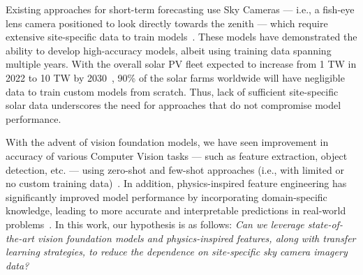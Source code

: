

Existing approaches for short-term forecasting use Sky Cameras --- i.e., a fish-eye lens camera positioned to look directly towards the zenith --- which require extensive site-specific data to train models~\cite{hammond2024,wacv2022}. These models have demonstrated the ability to develop high-accuracy models, albeit using training data spanning multiple years. With the overall solar PV fleet expected to increase from 1 TW in 2022 to 10 TW by 2030~\cite{isa2023}, 90\% of the solar farms worldwide will have negligible data to train custom models from scratch. Thus, lack of sufficient site-specific solar data underscores the need for approaches that do not compromise model performance.

With the advent of vision foundation models, we have seen improvement in accuracy of various Computer Vision tasks --- such as feature extraction, object detection, etc. --- using zero-shot and few-shot approaches (i.e., with limited or no custom training data)~\cite{google_vit, object_detection_foundation_models, vits_gt_cnns1}. In addition, physics-inspired feature engineering has significantly improved model performance by incorporating domain-specific knowledge, leading to more accurate and interpretable predictions in real-world problems~\cite{ompusunggu2021physics,erdmann2020physics}. In this work, our hypothesis is as follows: \textit{Can we leverage state-of-the-art vision foundation models and physics-inspired features, along with transfer learning strategies, to reduce the dependence on site-specific sky camera imagery data?}


